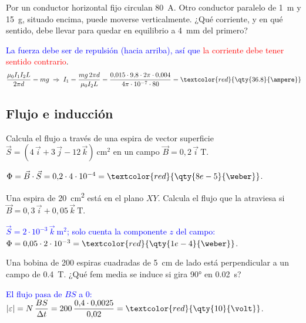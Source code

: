 \begin{exercise}
    Por un conductor horizontal fijo circulan \qty{80}{\ampere}. Otro conductor paralelo de \qty{1}{\m} y \qty{15}{\g}, situado encima, puede
    moverse verticalmente. ¿Qué corriente, y en qué sentido, debe llevar para quedar en equilibrio a \qty{4}{\mm} del primero?
    \begin{solu}
        \textcolor{blue}{La fuerza debe ser de repulsión (hacia arriba), así que} \textcolor{red}{la corriente debe tener sentido contrario}.
        \[ \dfrac{\mu_0 I_1 I_2 L}{2\pi d} = mg \;\Rightarrow\; I_1 = \dfrac{mg\,2\pi d}{\mu_0 I_2 L} = \dfrac{0{,}015\cdot 9{,}8\cdot 2\pi\cdot 0{,}004}{4\pi\cdot 10^{-7}\cdot 80} = \textcolor{red}{\qty{36.8}{\ampere}} \]
    \end{solu}
\end{exercise}

\subsection{Flujo e inducción}

\begin{exercise}
    Calcula el flujo a través de una espira de vector superficie \(\vec S = (4\,\vec{i} + 3\,\vec{j} - 12\,\vec{k})\ \unit{\cm\squared}\) en un campo
    \(\vec B = 0{,}2\,\vec{i}\ \unit{\tesla}\).
    \begin{solu}
        \(\Phi = \vec B\cdot\vec S = 0{,}2\cdot 4\cdot 10^{-4} = \textcolor{red}{\qty{8e-5}{\weber}}\).
    \end{solu}
\end{exercise}

\begin{exercise}
    Una espira de \qty{20}{\cm\squared} está en el plano \(XY\). Calcula el flujo que la atraviesa si \(\vec B = 0{,}3\,\vec{i} + 0{,}05\,\vec{k}\ \unit{\tesla}\).
    \begin{solu}
        \textcolor{blue}{\(\vec S = 2\cdot 10^{-3}\,\vec{k}\ \unit{\m\squared}\); solo cuenta la componente \(z\) del campo:}
        \(\Phi = 0{,}05\cdot 2\cdot 10^{-3} = \textcolor{red}{\qty{1e-4}{\weber}}\).
    \end{solu}
\end{exercise}

\begin{exercise}
    Una bobina de 200 espiras cuadradas de \qty{5}{\cm} de lado está perpendicular a un campo de \qty{0.4}{\tesla}. ¿Qué fem media se induce
    si gira \ang{90} en \qty{0.02}{\second}?
    \begin{solu}
        \textcolor{blue}{El flujo pasa de \(BS\) a 0:} \(|\varepsilon| = N\,\dfrac{BS}{\Delta t} = 200\,\dfrac{0{,}4\cdot 0{,}0025}{0{,}02} = \textcolor{red}{\qty{10}{\volt}}\).
    \end{solu}
\end{exercise}

